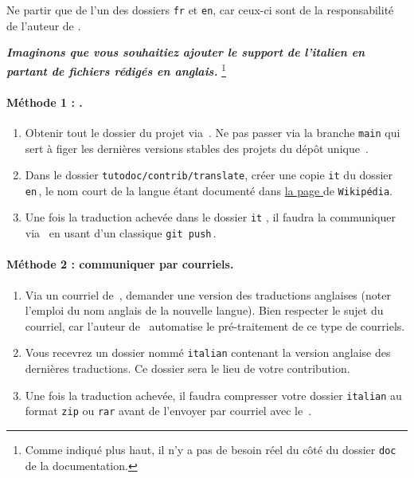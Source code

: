\begin{tdocwarn}
    Ne partir que de l'un des dossiers \verb#fr# et \verb#en#, car ceux-ci sont de la responsabilité de l'auteur de \thisproj.
\end{tdocwarn}


\medskip


\emph{\textbf{Imaginons que vous souhaitiez ajouter le support de l'italien en partant de fichiers rédigés en anglais.}}%
\footnote{
    Comme indiqué plus haut, il n'y a pas de besoin réel du côté du dossier \texttt{doc} de la documentation.
}


\paragraph{Méthode 1 : \git.}

\begin{enumerate}
    \item Obtenir tout le dossier du projet via \thisrepo\,.
    Ne pas passer via la branche \verb#main# qui sert à figer les dernières versions stables des projets du dépôt unique \thismonorepo\,.

    \item Dans le dossier \verb#tutodoc/contrib/translate#, créer une copie \verb#it# du dossier \verb#en#\,, le nom court de la langue étant documenté dans
    \href{https://en.wikipedia.org/wiki/IETF_language_tag#List_of_common_primary_language_subtags}%
         {la page }
    de \texttt{Wikipédia}.

    \item Une fois la traduction achevée dans le dossier \verb#it# , il faudra la communiquer via \thisrepo\ en usant d'un classique \verb#git push#\,.
\end{enumerate}


\paragraph{Méthode 2 : communiquer par courriels.}

\begin{enumerate}
    \item Via un courriel de \,, demander une version des traductions anglaises (noter l'emploi du nom anglais de la nouvelle langue).
    Bien respecter le sujet du courriel, car l'auteur de \thisproj\ automatise le pré-traitement de ce type de courriels.

    \item Vous recevrez un dossier nommé \verb#italian# contenant la version anglaise des dernières traductions.
    Ce dossier sera le lieu de votre contribution.

    \item Une fois la traduction achevée, il faudra compresser votre dossier \verb#italian# au format \verb#zip# ou \verb#rar# avant de l'envoyer par courriel avec le \,.
\end{enumerate}


